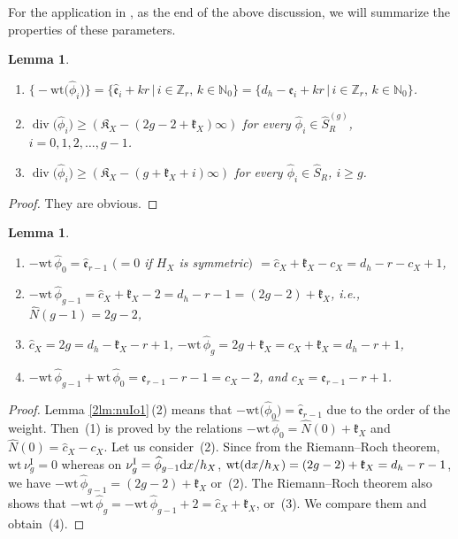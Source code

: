 \documentclass[10pt,a4paper]{amsart}
\def\ZZ{{\mathbb Z}}
\def\NN{{\mathbb N}}
\def\fK{{\mathfrak K}}
\def\fe{{\mathfrak e}}
\def\fk{{\mathfrak k}}
\def\hc{{\widehat c}}
\def\hN{{\widehat N}}
\def\hS{{\widehat S}}
\def\hfe{{\widehat{\mathfrak e}}}
\def\hphi{{\widehat \phi}}
\def\Div{\operatorname{div}}
\def\wt{{\mathrm {wt}}}
\def\nuI#1{{\nu^{\mathrm{I}}_{#1}}}
\numberwithin{equation}{section}
\newtheorem{Lemma}[Theorem]{Lemma}
\begin{document}
For the application in \cite{KMP2022b}, as the end of the above discussion, we will summarize the properties of these parameters.

\begin{Lemma}\label{2lm:nuIo1_2}\quad
\begin{enumerate}\itemsep=0pt
\item[$1.$] $\big\{{-}\wt\big(\hphi_i\big)\big\}=\{\hfe_i + k r\, |\,i \in \ZZ_r,\, k \in \NN_0\}=\{d_h - \fe_i + k r\, |\,i \in \ZZ_r,\, k \in \NN_0\}$.

\item[$2.$] $\Div\big(\hphi_i\big)\ge(\fK_X-(2g-2+\fk_X)\infty)$ for every $\hphi_i
\in \hS_R^{(g)}$, $i=0, 1, 2,\dots,g-1$.

\item[$3.$] $\Div\big(\hphi_i\big)\ge(\fK_X-(g+\fk_X+i)\infty)$ for every $\hphi_i \in \hS_R$, $i\ge g$.
\end{enumerate}
\end{Lemma}

\begin{proof}They are obvious.
\end{proof}

\begin{Lemma}\label{2lm:nuIo2}\quad
\begin{enumerate}\itemsep=0pt
\item[$(1)$] $-\wt\, \hphi_{0}= \hfe_{r-1}$ $(=0$ if $H_X$ is symmetric$)$
$= \hc_X+\fk_X-c_X =d_h - r-c_X+1$,

\item[$(2)$] $-\wt\, \hphi_{g-1}= \hc_X+\fk_X-2= d_h - r- 1=
(2g-2)+\fk_X$, i.e., $\hN(g-1) = 2g-2$,

\item[$(3)$] $ \hc_X = 2g=d_h -\fk_X-r+1$,
$-\wt\, \hphi_{g}=2g+\fk_X=\hc_X+\fk_X=d_h - r+1$,

\item[$(4)$] $-\wt\, \hphi_{g-1}+\wt\, \hphi_{0}=\fe_{r-1}-r-1= c_X-2$, and
$c_X= \fe_{r-1} - r+1$.

\end{enumerate}
\end{Lemma}

\begin{proof}
Lemma \ref{2lm:nuIo1}\,(2) means that $-\wt\big(\hphi_{0}\big)=\hfe_{r-1}$ due to
the order of the weight.
Then~(1) is proved by the relations $-\wt\, \hphi_{0}=\hN(0)+\fk_X$ and $\hN(0) = \hc_X-c_X$.
Let us consider~(2). Since from the Riemann--Roch theorem, $\wt \, \nuI{g} = 0$ whereas on $\nuI{g}=\hphi_{g-1}{\rm d} x/h_X$, $\wt({\rm d} x/h_X)=(2g-2)+\fk_X=d_h - r-1$, we have $-\wt\, \hphi_{g-1}=(2g-2)+\fk_X$ or~(2).
The Riemann--Roch theorem also shows that $-\wt\, \hphi_{g}=-\wt\, \hphi_{g-1}+2 = \hc_X +\fk_X$, or~(3).
We compare them and obtain~(4).
\end{proof}
\end{document}
